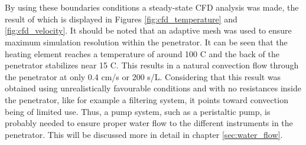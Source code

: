 \\
\\
By using these boundaries conditions a steady-state CFD analysis was made, the result of which is displayed in Figures \ref{fig:cfd_temperature} and \ref{fig:cfd_velocity}. It should be noted that an adaptive mesh was used to ensure maximum simulation resolution within the penetrator.
It can be seen that the heating element reaches a temperature of around 100 \textdegree C and the back of the penetrator stabilizes near 15 \textdegree C. This results in a natural convection flow through the penetrator at only 0.4 cm/s or 200 s/L. Considering that this result was obtained using unrealistically favourable conditions and with no resistances inside the penetrator, like for example a filtering system, it points toward convection being of limited use. Thus, a pump system, such as a peristaltic pump, is probably needed to ensure proper water flow to the different instruments in the penetrator. This will be discussed more in detail in chapter \ref{sec:water_flow}.



